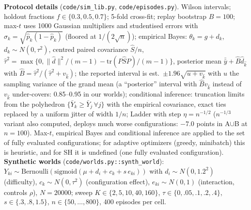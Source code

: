 \textbf{Protocol details} (\texttt{code/sim\_lib.py}, \texttt{code/episodes.py}). Wilson intervals; holdout fractions $f\in\{0.3,0.5,0.7\}$; 5-fold cross-fit; replay bootstrap $B{=}100$; max-$t$ uses 1000 Gaussian multipliers and studentised errors with $\hat\sigma_k=\sqrt{\hat p_k(1-\hat p_k)}$ (floored at $1/(2\sqrt n)$); empirical Bayes: $\theta_k=g+d_k$, $d_k\sim N(0,\tau^2)$, centred paired covariance $\hat S/n$, $\hat\tau^2=\max\{0,\|\hat d\|^2/(m-1)-\mathrm{tr}(P\hat SP)/(m-1)\}$, posterior mean $\bar{\bar y}+\hat B\hat d_{\hat k}$ with $\hat B=\hat\tau^2/(\hat\tau^2+v_{\hat k})$; the reported interval is est.\ $\pm1.96\sqrt{u+v_{\hat k}}$ with $u$ the sampling variance of the grand mean (a ``posterior'' interval with $\hat B v_{\hat k}$ instead of $v_{\hat k}$ under-covers: 0.85--0.95 in our worlds); conditional inference: truncation limits from the polyhedron $\{\bar Y_k\ge\bar Y_j\,\forall j\}$ with the empirical covariance, exact ties replaced by a uniform jitter of width $1/n$; Ladder with step $\eta=n^{-1/2}$ ($n^{-1/3}$ variant also computed, deploys much worse configurations: $-7.0$ points in A$\cup$B at $n{=}100$). Max-$t$, empirical Bayes and conditional inference are applied to the set of fully evaluated configurations; for adaptive optimizers (greedy, minibatch) this is heuristic, and for SH it is undefined (one fully evaluated configuration).
\textbf{Synthetic worlds} (\texttt{code/worlds.py::synth\_world}): $Y_{ki}\sim\mathrm{Bernoulli}(\mathrm{sigmoid}(\mu+d_i+c_k+s\,e_{ki}))$ with $d_i\sim N(0,1.2^2)$ (difficulty), $c_k\sim N(0,\tau^2)$ (configuration effect), $e_{ki}\sim N(0,1)$ (interaction, controls $\rho$), $N=20000$; sweep $K\in\{2,5,10,40,160\}$, $\tau\in\{0,.05,.1,.2,.4\}$, $s\in\{.3,.8,1.5\}$, $n\in\{50,\dots,800\}$, 400 episodes per cell.

